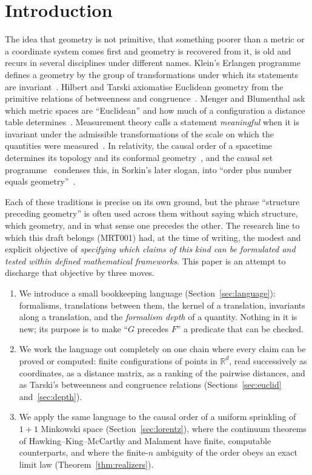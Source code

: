 \documentclass[11pt,a4paper]{article}
\theoremstyle{plain}
\theoremstyle{definition}
\theoremstyle{remark}
\newcommand{\R}{\mathbb{R}}
\begin{document}
\section{Introduction}\label{sec:intro}

The idea that geometry is not primitive, that something poorer than a metric or a coordinate system comes first and geometry is recovered from it, is old and recurs in several disciplines under different names. Klein's Erlangen programme defines a geometry by the group of transformations under which its statements are invariant~\citep{klein1872}. Hilbert and Tarski axiomatise Euclidean geometry from the primitive relations of betweenness and congruence~\citep{hilbert1899,tarski1959,tarskigivant1999}. Menger and Blumenthal ask which metric spaces are ``Euclidean'' and how much of a configuration a distance table determines~\citep{menger1928,blumenthal1953}. Measurement theory calls a statement \emph{meaningful} when it is invariant under the admissible transformations of the scale on which the quantities were measured~\citep{stevens1946,krantz1971,narens2002}. In relativity, the causal order of a spacetime determines its topology and its conformal geometry~\citep{hawking1976,malament1977}, and the causal set programme~\citep{bombelli1987} condenses this, in Sorkin's later slogan, into ``order plus number equals geometry''~\citep{sorkin2005}.

Each of these traditions is precise on its own ground, but the phrase ``structure preceding geometry'' is often used across them without saying which structure, which geometry, and in what sense one precedes the other. The research line to which this draft belongs (MRT001) had, at the time of writing, the modest and explicit objective of \emph{specifying which claims of this kind can be formulated and tested within defined mathematical frameworks}. This paper is an attempt to discharge that objective by three moves.

\begin{enumerate}[leftmargin=2em]
\item We introduce a small bookkeeping language (Section~\ref{sec:language}): formalisms, translations between them, the kernel of a translation, invariants along a translation, and the \emph{formalism depth} of a quantity. Nothing in it is new; its purpose is to make ``$G$ precedes $F$'' a predicate that can be checked.
\item We work the language out completely on one chain where every claim can be proved or computed: finite configurations of points in $\R^d$, read successively as coordinates, as a distance matrix, as a ranking of the pairwise distances, and as Tarski's betweenness and congruence relations (Sections~\ref{sec:euclid} and~\ref{sec:depth}).
\item We apply the same language to the causal order of a uniform sprinkling of $1{+}1$ Minkowski space (Section~\ref{sec:lorentz}), where the continuum theorems of Hawking--King--McCarthy and Malament have finite, computable counterparts, and where the finite-$n$ ambiguity of the order obeys an exact limit law (Theorem~\ref{thm:realizers}).
\end{enumerate}
\end{document}
